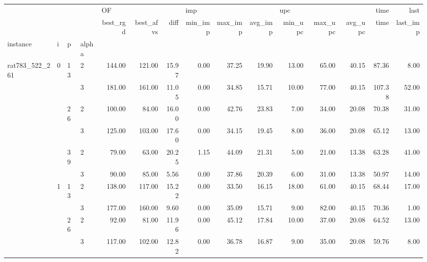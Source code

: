 \begin{tabular}{llllrrrrrrrrrrr}
\toprule
               &   &    &   & \multicolumn{3}{l}{OF} & \multicolumn{3}{l}{imp} & \multicolumn{3}{l}{upc} &   time &     last \\
               &   &    &   & best\_rgd & best\_afvs &  diff & min\_imp & max\_imp & avg\_imp & min\_upc & max\_upc & avg\_upc &   time & last\_imp \\
instance & i & p & alpha &          &           &       &         &         &         &         &         &         &        &          \\
\midrule
\multirow{60}{*}{rat783\_522\_261} & \multirow{6}{*}{0} & \multirow{2}{*}{13} & 2 &   144.00 &    121.00 & 15.97 &    0.00 &   37.25 &   19.90 &   13.00 &   65.00 &   40.15 &  87.36 &     8.00 \\
               &   &    & 3 &   181.00 &    161.00 & 11.05 &    0.00 &   34.85 &   15.71 &   10.00 &   77.00 &   40.15 & 107.38 &    52.00 \\
\cline{3-15}
               &   & \multirow{2}{*}{26} & 2 &   100.00 &     84.00 & 16.00 &    0.00 &   42.76 &   23.83 &    7.00 &   34.00 &   20.08 &  70.38 &    31.00 \\
               &   &    & 3 &   125.00 &    103.00 & 17.60 &    0.00 &   34.15 &   19.45 &    8.00 &   36.00 &   20.08 &  65.12 &    13.00 \\
\cline{3-15}
               &   & \multirow{2}{*}{39} & 2 &    79.00 &     63.00 & 20.25 &    1.15 &   44.09 &   21.31 &    5.00 &   21.00 &   13.38 &  63.28 &    41.00 \\
               &   &    & 3 &    90.00 &     85.00 &  5.56 &    0.00 &   37.86 &   20.39 &    6.00 &   31.00 &   13.38 &  50.97 &    14.00 \\
\cline{2-15}
\cline{3-15}
               & \multirow{6}{*}{1} & \multirow{2}{*}{13} & 2 &   138.00 &    117.00 & 15.22 &    0.00 &   33.50 &   16.15 &   18.00 &   61.00 &   40.15 &  68.44 &    17.00 \\
               &   &    & 3 &   177.00 &    160.00 &  9.60 &    0.00 &   35.09 &   15.71 &    9.00 &   82.00 &   40.15 &  70.36 &     1.00 \\
\cline{3-15}
               &   & \multirow{2}{*}{26} & 2 &    92.00 &     81.00 & 11.96 &    0.00 &   45.12 &   17.84 &   10.00 &   37.00 &   20.08 &  64.52 &    13.00 \\
               &   &    & 3 &   117.00 &    102.00 & 12.82 &    0.00 &   36.78 &   16.87 &    9.00 &   35.00 &   20.08 &  59.76 &     8.00 \\

\end{tabular}
